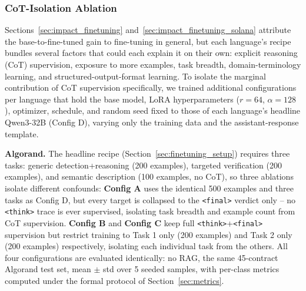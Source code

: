 \documentclass[lettersize,journal]{IEEEtran}
\begin{document}

\subsubsection{CoT-Isolation Ablation}
\label{sec:cot_ablation}

Sections~\ref{sec:impact_finetuning} and~\ref{sec:impact_finetuning_solana} attribute the
base-to-fine-tuned gain to fine-tuning in general, but each language's recipe bundles several
factors that could each explain it on their own: explicit reasoning (CoT) supervision, exposure to
more examples, task breadth, domain-terminology learning, and structured-output-format learning. To
isolate the marginal contribution of CoT supervision specifically, we trained additional
configurations per language that hold the base model, LoRA hyperparameters ($r=64$, $\alpha=128$),
optimizer, schedule, and random seed fixed to those of each language's headline Qwen3-32B
(Config D), varying only the training data and the assistant-response template.

\textbf{Algorand.} The headline recipe (Section~\ref{sec:finetuning_setup}) requires three tasks:
generic detection+reasoning (200 examples), targeted verification (200 examples), and semantic
description (100 examples, no CoT), so three ablations isolate different confounds: \textbf{Config
A} uses the identical 500 examples and three tasks as Config D, but every target is collapsed to the
\texttt{<final>} verdict only -- no \texttt{<think>} trace is ever supervised, isolating task
breadth and example count from CoT supervision. \textbf{Config B} and \textbf{Config C} keep full
\texttt{<think>}+\texttt{<final>} supervision but restrict training to Task 1 only (200 examples)
and Task 2 only (200 examples) respectively, isolating each individual task from the others. All
four configurations are evaluated identically: no RAG, the same 45-contract Algorand test set, mean
$\pm$ std over 5 seeded samples, with per-class metrics computed under the formal protocol of
Section~\ref{sec:metrics}.
\end{document}
